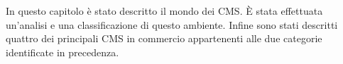 
In questo capitolo è stato descritto il mondo dei CMS. È stata effettuata un'analisi e una classificazione di questo ambiente. Infine sono stati descritti quattro dei principali CMS in commercio appartenenti alle due categorie identificate in precedenza.